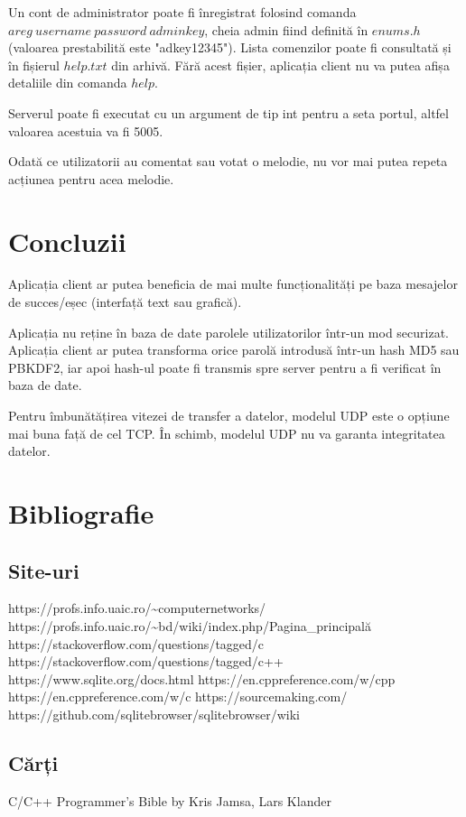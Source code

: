 \documentclass{article}
\begin{document}
Un cont de administrator poate fi înregistrat folosind comanda \linebreak $areg\ username\ password\ adminkey$, cheia admin fiind definită în $enums.h$\linebreak(valoarea prestabilită este "adkey12345"). Lista comenzilor poate fi consultată și în fișierul $help.txt$ din arhivă. Fără acest fișier, aplicația client nu va putea afișa detaliile din comanda $help$.

Serverul poate fi executat cu un argument de tip int pentru a seta portul, altfel valoarea acestuia va fi 5005.

Odată ce utilizatorii au comentat sau votat o melodie, nu vor mai putea repeta acțiunea pentru acea melodie.

\section{Concluzii}
\hspace{4mm} Aplicația client ar putea beneficia de mai multe funcționalități pe baza mesajelor de succes/eșec (interfață text sau grafică). 

Aplicația nu reține în baza de date parolele utilizatorilor într-un mod securizat. Aplicația client ar putea transforma orice parolă introdusă într-un hash MD5 sau PBKDF2, iar apoi hash-ul poate fi transmis spre server pentru a fi verificat în baza de date.

Pentru îmbunătățirea vitezei de transfer a datelor, modelul UDP este o opțiune mai buna față de cel TCP. În schimb, modelul UDP nu va garanta integritatea datelor.



\section{Bibliografie}
\subsection{Site-uri}
https://profs.info.uaic.ro/\textasciitilde computernetworks/
\linebreak
https://profs.info.uaic.ro/\textasciitilde bd/wiki/index.php/Pagina\_principală
\linebreak
https://stackoverflow.com/questions/tagged/c
\linebreak
https://stackoverflow.com/questions/tagged/c++
\linebreak
https://www.sqlite.org/docs.html
\linebreak
https://en.cppreference.com/w/cpp
\linebreak
https://en.cppreference.com/w/c
\linebreak
https://sourcemaking.com/
\linebreak
https://github.com/sqlitebrowser/sqlitebrowser/wiki
\linebreak

\subsection{Cărți}
C/C++ Programmer's Bible by Kris Jamsa, Lars Klander
\end{document}
